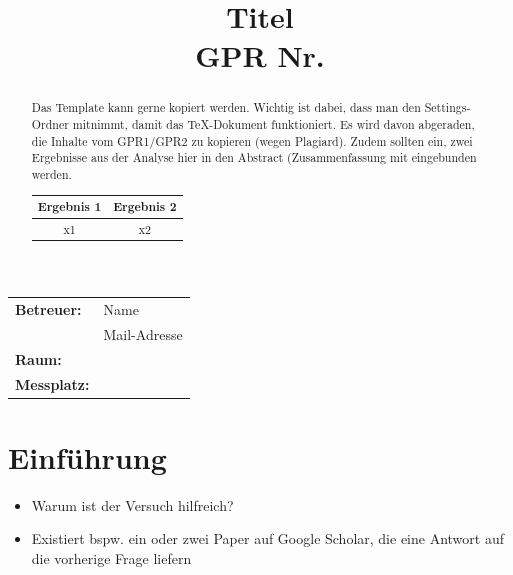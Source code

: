 \documentclass[bibliography=totocnumbered]{scrartcl}
\title{\Huge Titel\\
    \huge \ac{GPR} Nr.
}
\begin{document}
    \renewcommand{\abstractname}{Abstract} %
    \begin{titlepage}
        \centering
        \maketitle
        \vspace{1cm}
        \begin{tabular}{ll}
				\textbf{Betreuer:} & Name \\ 
				& Mail-Adresse\\
				\textbf{Raum:} &  \\ 
				\textbf{Messplatz:} &  \\
		\end{tabular}
        \vspace{1cm}
        \begin{abstract}
            \noindent Das Template kann gerne kopiert werden. Wichtig ist dabei, dass man den Settings-Ordner mitnimmt, damit das \TeX-Dokument funktioniert. Es wird davon abgeraden, die Inhalte vom GPR1/GPR2 zu kopieren (wegen Plagiard). Zudem sollten ein, zwei Ergebnisse aus der Analyse hier in den Abstract (Zusammenfassung mit eingebunden werden.
            \begin{table}[H]
                \centering
                \begin{tabular}{c|c}
                   Ergebnis 1  & Ergebnis 2 \\
                   \hline
                    x1 & x2
                \end{tabular}
            \end{table}
        \end{abstract}
    \end{titlepage}
    \tableofcontents
    \listoffigures
    \listoftables
    
    \newpage
    \section{Einführung}
        \begin{itemize}
            \item Warum ist der Versuch hilfreich?
            \item Existiert \ac{bspw.} ein oder zwei Paper auf Google Scholar, die eine Antwort auf die vorherige Frage liefern
        \end{itemize}
\end{document}
